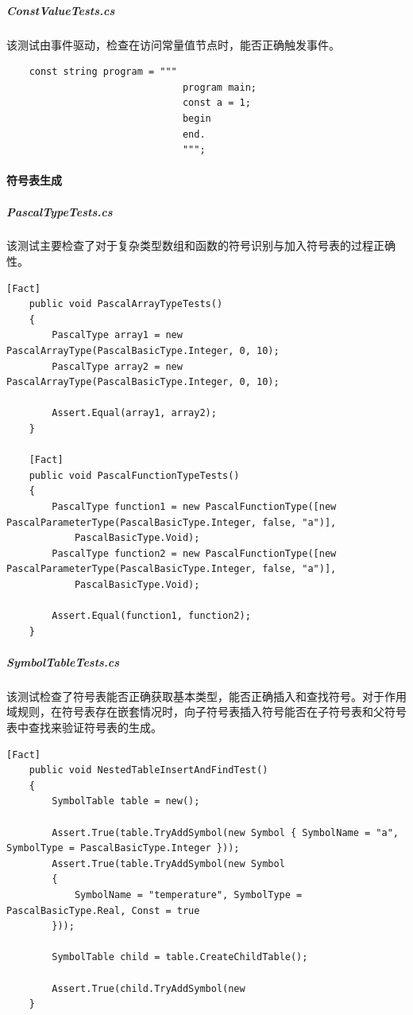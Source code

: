 \documentclass[../main.tex]{subfiles}
\begin{document}
\subparagraph{ConstValueTests.cs}
该测试由事件驱动，检查在访问常量值节点时，能否正确触发事件。

\begin{lstlisting}
    const string program = """
                               program main;
                               const a = 1;
                               begin
                               end.
                               """;
\end{lstlisting}



\paragraph{符号表生成}
\subparagraph{PascalTypeTests.cs}
该测试主要检查了对于复杂类型数组和函数的符号识别与加入符号表的过程正确性。

\begin{lstlisting}[style=csharp]
    [Fact]
    public void PascalArrayTypeTests()
    {
        PascalType array1 = new PascalArrayType(PascalBasicType.Integer, 0, 10);
        PascalType array2 = new PascalArrayType(PascalBasicType.Integer, 0, 10);

        Assert.Equal(array1, array2);
    }

    [Fact]
    public void PascalFunctionTypeTests()
    {
        PascalType function1 = new PascalFunctionType([new PascalParameterType(PascalBasicType.Integer, false, "a")],
            PascalBasicType.Void);
        PascalType function2 = new PascalFunctionType([new PascalParameterType(PascalBasicType.Integer, false, "a")],
            PascalBasicType.Void);

        Assert.Equal(function1, function2);
    }
\end{lstlisting}

\subparagraph{SymbolTableTests.cs}
该测试检查了符号表能否正确获取基本类型，能否正确插入和查找符号。对于作用域规则，在符号表存在嵌套情况时，向子符号表插入符号能否在子符号表和父符号表中查找来验证符号表的生成。

\begin{lstlisting}[style =csharp]
    [Fact]
    public void NestedTableInsertAndFindTest()
    {
        SymbolTable table = new();

        Assert.True(table.TryAddSymbol(new Symbol { SymbolName = "a", SymbolType = PascalBasicType.Integer }));
        Assert.True(table.TryAddSymbol(new Symbol
        {
            SymbolName = "temperature", SymbolType = PascalBasicType.Real, Const = true
        }));

        SymbolTable child = table.CreateChildTable();

        Assert.True(child.TryAddSymbol(new 
    }
\end{lstlisting}
\end{document}

